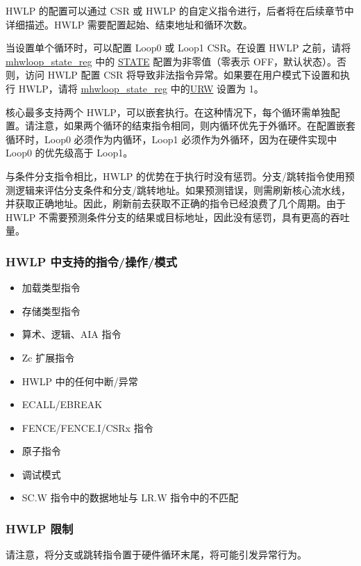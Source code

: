 \documentclass[main\_\_CN.tex]{subfiles}
\begin{document}
HWLP 的配置可以通过 CSR 或 HWLP 的自定义指令进行，后者将在后续章节中详细描述。HWLP 需要配置起始、结束地址和循环次数。

当设置单个循环时，可以配置 Loop0 或 Loop1 CSR。在设置 HWLP 之前，请将 \hyperref[sec:riscvcpu-hwloop-reg-desc]{mhwloop\_state\_reg}  中的 \hyperref[regdesc:mhwlp_state_reg]{STATE} 配置为非零值（零表示 OFF，默认状态）。否则，访问 HWLP 配置 CSR 将导致非法指令异常。如果要在用户模式下设置和执行 HWLP，请将 \hyperref[sec:riscvcpu-hwloop-reg-desc]{mhwloop\_state\_reg} 中的\hyperref[regdesc:mhwlp_state_reg]{URW} 设置为 1。

核心最多支持两个 HWLP，可以嵌套执行。在这种情况下，每个循环需单独配置。请注意，如果两个循环的结束指令相同，则内循环优先于外循环。在配置嵌套循环时，Loop0 必须作为内循环，Loop1 必须作为外循环，因为在硬件实现中 Loop0 的优先级高于 Loop1。

与条件分支指令相比，HWLP 的优势在于执行时没有惩罚。分支/跳转指令使用预测逻辑来评估分支条件和分支/跳转地址。如果预测错误，则需刷新核心流水线，并获取正确地址。因此，刷新前去获取不正确的指令已经浪费了几个周期。由于 HWLP 不需要预测条件分支的结果或目标地址，因此没有惩罚，具有更高的吞吐量。

\subsubsection{HWLP 中支持的指令/操作/模式}
\label{sec:riscvcpu-hwloop-inst}

\begin{itemize}
    \item 加载类型指令
    \item 存储类型指令
    \item 算术、逻辑、AIA 指令
    \item Zc 扩展指令
    \item HWLP 中的任何中断/异常
    \item ECALL/EBREAK
    \item FENCE/FENCE.I/CSRx 指令
    \item 原子指令
    \item 调试模式
    \item SC.W 指令中的数据地址与 LR.W 指令中的不匹配
\end{itemize}

\subsubsection{HWLP 限制}
\label{sec:riscvcpu-hwloop-constraints}

请注意，将分支或跳转指令置于硬件循环末尾，将可能引发异常行为。
\end{document}

